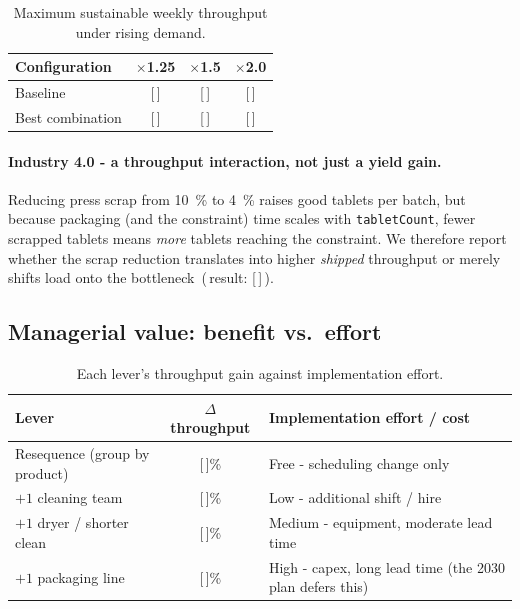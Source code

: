 \begin{table}[H]
\centering
\caption{Maximum sustainable weekly throughput under rising demand.}
\label{tab:demand}
\begin{tabularx}{\textwidth}{l c c c}
\toprule
Configuration & $\times$1.25 & $\times$1.5 & $\times$2.0 \\
\midrule
Baseline         & [\,] & [\,] & [\,] \\
Best combination & [\,] & [\,] & [\,] \\
\bottomrule
\end{tabularx}
\end{table}

\paragraph{Industry 4.0 - a throughput interaction, not just a yield gain.}
Reducing press scrap from \SI{10}{\percent} to \SI{4}{\percent} raises good
tablets per batch, but because packaging (and the constraint) time scales with
\texttt{tabletCount}, fewer scrapped tablets means \emph{more} tablets reaching
the constraint. We therefore report whether the scrap reduction translates into
higher \emph{shipped} throughput or merely shifts load onto the bottleneck
\,(\,result: [\,]\,).

\subsection{Managerial value: benefit vs.\ effort}
\label{sec:value}
\begin{table}[H]
\centering
\caption{Each lever's throughput gain against implementation effort.}
\label{tab:value}
\begin{tabularx}{\textwidth}{l c X}
\toprule
Lever & $\Delta$ throughput & Implementation effort / cost \\
\midrule
Resequence (group by product) & [\,]\% & Free - scheduling change only \\
$+1$ cleaning team            & [\,]\% & Low - additional shift / hire \\
$+1$ dryer / shorter clean    & [\,]\% & Medium - equipment, moderate lead time \\
$+1$ packaging line           & [\,]\% & High - capex, long lead time (the 2030 plan defers this) \\
\bottomrule
\end{tabularx}
\end{table}